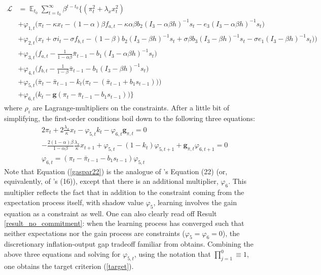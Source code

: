 \documentclass[11pt]{article}
\renewcommand{\[}{\begin{equation}}
\renewcommand{\]}{\end{equation}}
\DeclareMathOperator{\E}{\mathbb{E}}
\begin{document}
 \begin{align}
\mathcal{L} &= \E_{t_0}\sum_{t=t_0}^{\infty} \beta^{t-t_0}\bigg\{  (\pi_t^2  + \lambda_x x_t^2 )  \\
 & + \varphi_{1,t} \bigg(\pi_t - \kappa x_t -(1-\alpha)\beta f_{a,t} -\kappa\alpha\beta b_2 (I_3 - \alpha\beta h)^{-1}s_t - e_3(I_3 - \alpha\beta h)^{-1}s_t \bigg) \label{midsimple_first}\\
 & + \varphi_{2,t} \bigg(x_t + \sigma i_t -\sigma f_{b,t}  -  (1-\beta)b_2 (I_3 - \beta h)^{-1}s_t + \sigma\beta b_3 (I_3 - \beta h)^{-1}s_t -\sigma e_1(I_3 - \beta h)^{-1}s_t  \big)\bigg) \\
 & +  \varphi_{3,t}  \bigg(f_{a,t} - \frac{1}{1-\alpha\beta}\bar{\pi}_{t-1}  - b_1(I_3 - \alpha\beta h)^{-1}s_t  \bigg) \\
 & + \varphi_{4,t}  \bigg(f_{b,t} - \frac{1}{1-\beta}\bar{\pi}_{t-1}  - b_1(I_3 - \beta h)^{-1}s_t \bigg)  \\
  & + \varphi_{5,t}  \bigg(  \bar{\pi}_{t} - \bar{\pi}_{t-1} - k_t\big(\pi_{t} -(\bar{\pi}_{t-1}+b_1 s_{t-1}) \big)   \bigg)  \\
  & + \varphi_{6,t}  \bigg(k_t - \mathbf{g}(\pi_t - \bar{\pi}_{t-1}-b_1 s_{t-1})  \bigg)
  \bigg\} \label{midsimple_last}
\end{align}
where $\rho_i$ are Lagrange-multipliers on the constraints.
After a little bit of simplifying, the first-order conditions boil down to the following three equations:
\begin{align}
& 2\pi_t + 2\frac{\lambda_x}{\kappa}x_t -\varphi_{5,t} k_t - \varphi_{6,t} \mathbf{g}_{\pi,t} = 0 \label{gaspar22}\\
& -\frac{2(1-\alpha)\beta}{1-\alpha\beta}\frac{\lambda_x}{\kappa}x_{t+1} + \varphi_{5,t} -(1-k_t)\varphi_{5,t+1} +\mathbf{g}_{\bar{\pi},t}\varphi_{6,t+1} = 0 \label{gaspar21}\\
& \varphi_{6,t} = (\pi_t - \bar{\pi}_{t-1}-b_1 s_{t-1}) \varphi_{5,t} \label{constraints}
\end{align}
Note that Equation (\ref{gaspar22}) is the analogue of \cite{gaspar2010inflation}'s Equation (22) (or, equivalently, of  \cite{molnar2014optimal}'s (16)), except that there is an additional multiplier, $\varphi_6$. This multiplier reflects the fact that in addition to the constraint coming from the expectation process itself, with shadow value $\varphi_5$, learning involves the gain equation as a constraint as well. One can also clearly read off Result \ref{result_no_commitment}: when the learning process has converged such that neither expectations nor the gain process are constraints ($\varphi_5 =\varphi_6 = 0$), the discretionary inflation-output gap tradeoff familiar from \cite{clarida1999science} obtains. Combining the above three equations and solving for $\varphi_{5,t}$, using the notation that $\prod_{j=1}^{0} \equiv 1$, one obtains the target criterion (\ref{target}).
\end{document}

